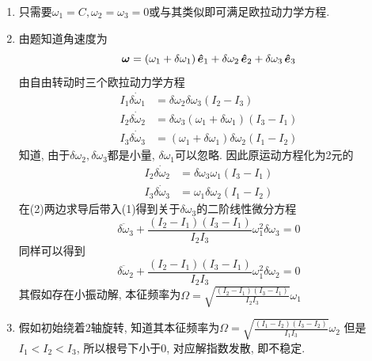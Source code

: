\begin{solution}
    \begin{enumerate}[label=(\arabic*)]
        \item 只需要$\omega_1=C,\omega_2=\omega_3=0$或与其类似即可满足欧拉动力学方程.
        \item 由题知道角速度为
        $$\boldsymbol{\omega}=(\omega_1+\delta\omega_1)\,\boldsymbol{\hat{e}}_1+\delta\omega_2\,\boldsymbol{\hat{e}}_2+\delta\omega_3\,\boldsymbol{\hat{e}}_3$$
        由自由转动时三个欧拉动力学方程
        \begin{align*}
            I_1\dot{\delta\omega_1}&=\delta\omega_2\delta\omega_3(I_2-I_3)\\
            I_2\dot{\delta\omega_2}&=\delta\omega_3(\omega_1+\delta\omega_1)(I_3-I_1)\\
            I_3\dot{\delta\omega_3}&=(\omega_1+\delta\omega_1)\delta\omega_2(I_1-I_2)
        \end{align*}
        知道, 由于$\delta\omega_2,\delta\omega_3$都是小量, $\delta\omega_1$可以忽略. 
        因此原运动方程化为2元的
        \begin{align}
            I_2\dot{\delta\omega_2}&=\delta\omega_3\omega_1(I_3-I_1)\\
            I_3\dot{\delta\omega_3}&=\omega_1\delta\omega_2(I_1-I_2)
        \end{align}
        在(2)两边求导后带入(1)得到关于$\delta\omega_3$的二阶线性微分方程
        $$\ddot{\delta\omega_3}+\frac{(I_2-I_1)(I_3-I_1)}{I_2I_3}\omega_1^2\delta\omega_3=0$$
        同样可以得到
        $$\ddot{\delta\omega_2}+\frac{(I_2-I_1)(I_3-I_1)}{I_2I_3}\omega_1^2\delta\omega_2=0$$
        其假如存在小振动解, 本征频率为$\Omega=\sqrt{\frac{(I_2-I_1)(I_3-I_1)}{I_2I_3}}\omega_1$
        \item 假如初始绕着$2$轴旋转, 知道其本征频率为$\Omega=\sqrt{\frac{(I_1-I_2)(I_3-I_2)}{I_1I_3}}\omega_2$
        但是$I_1<I_2<I_3$, 所以根号下小于$0$, 对应解指数发散, 即不稳定.
    \end{enumerate}
\end{solution}


